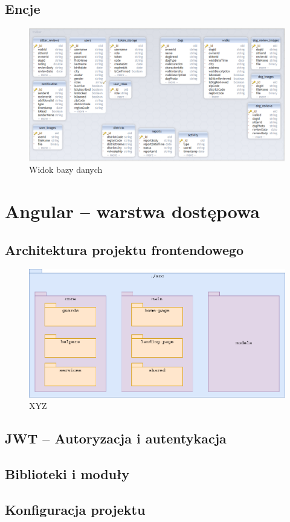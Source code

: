 \subsection{Encje}
\begin{figure}[H]
  \centering
  \includegraphics[width=1\linewidth]{rysunki/database.PNG}
  \caption{Widok bazy danych}
  \label{fig:database}
\end{figure}  

\newpage
\section{Angular -- warstwa dostępowa}
\subsection{Architektura projektu frontendowego}
\begin{figure}[H]
  \centering
  \includegraphics[width=1\linewidth]{rysunki/angular-arch.png}
  \caption{XYZ}
  \label{fig:xyz}
\end{figure}

\subsection{JWT -- Autoryzacja i autentykacja}

\subsection{Biblioteki i moduły}

\subsection{Konfiguracja projektu}